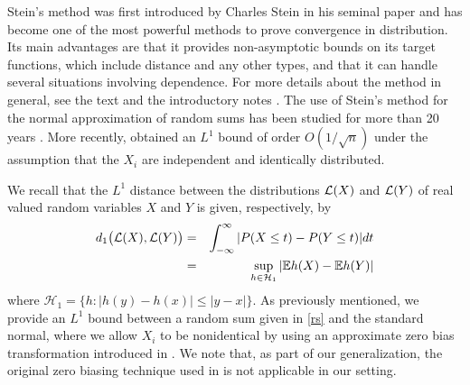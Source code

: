 \documentclass[pdflatex,sn-mathphys-ay]{sn-jnl}
\newcommand{\mcolor}[1]{\textcolor{red}{#1}}  %
\newcommand{\bea}{\begin{eqnarray}}
\newcommand{\ena}{\end{eqnarray}}
\newcommand{\beas}{\begin{eqnarray*}}
\newcommand{\enas}{\end{eqnarray*}}
\newcommand{\nn}{\nonumber}
\newcommand{\E}{\mathbb{E}}
\theoremstyle{thmstyleone}%
\theoremstyle{thmstyletwo}%
\theoremstyle{thmstylethree}%
\begin{document}
Stein's method was first introduced by Charles Stein in his seminal paper \citep{Stein72} and has become one of the most powerful methods to prove convergence in distribution. Its main advantages are that it provides non-asymptotic bounds on its target functions, which include distance and any other types, and that it can handle several situations involving dependence. For more details about the method in general, see the text \citep{CGS11} and the introductory notes \citep{Ross11}. The use of Stein's method for the normal approximation of random sums has been studied for more than 20 years \citep{barbour2006normal,chaidee2008berry}. More recently, \cite{Dal22} obtained an $L^1$ bound of order $O(1/\sqrt{n})$ under the assumption that the $X_i$ are independent and identically distributed.

We recall that the $L^1$  distance between the distributions ${\cal L}(X)$ and ${\cal L}(Y)$ of real valued random variables $X$ and $Y$ is given, respectively, by
\bea \label{Wasdef}
d_1 \big({\cal L}(X),{\cal L}(Y)\big) &=& \int_{-\infty}^\infty |P(X \le t) - P(Y \le t)| dt \nn \\
&=& \sup_{h \in \mathcal{H}_1} |\E h(X)-\E h(Y)| 
\ena 
where $\mathcal{H}_1 =\{h: |h(y)-h(x)| \le |y-x|\}$. As previously mentioned, we provide an $L^1$ bound between a random sum given in \eqref{rs} and the standard normal, where we allow $X_i$ to be nonidentical by using an approximate zero bias transformation introduced in  \cite{NW2017}. We note that, as part of our generalization, the original zero biasing technique  \citep{GR97} used in \cite{EKJ09} is not applicable in our setting. 
\end{document}
